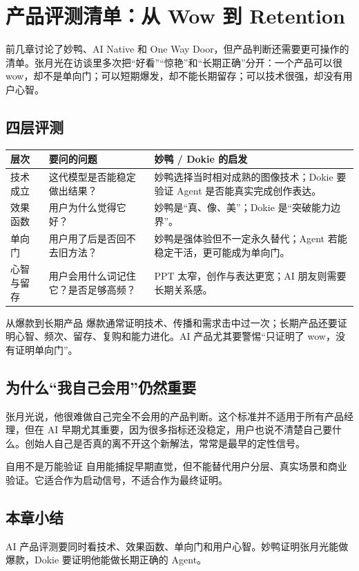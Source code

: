 \section{产品评测清单：从 Wow 到 Retention}

前几章讨论了妙鸭、AI Native 和 One Way Door，但产品判断还需要更可操作的清单。张月光在访谈里多次把“好看”“惊艳”和“长期正确”分开：一个产品可以很 wow，却不是单向门；可以短期爆发，却不能长期留存；可以技术很强，却没有用户心智。

\subsection{四层评测}

\begin{longtable}{p{}p{}p{}}
\toprule
层次 & 要问的问题 & 妙鸭 / Dokie 的启发 \\
\midrule
技术成立 & 这代模型是否能稳定做出结果？ & 妙鸭选择当时相对成熟的图像技术；Dokie 要验证 Agent 是否能真实完成创作表达。 \\
效果函数 & 用户为什么觉得它好？ & 妙鸭是“真、像、美”；Dokie 是“突破能力边界”。 \\
单向门 & 用户用了后是否回不去旧方法？ & 妙鸭是强体验但不一定永久替代；Agent 若能稳定干活，更可能成为单向门。 \\
心智与留存 & 用户会用什么词记住它？是否足够高频？ & PPT 太窄，创作与表达更宽；AI 朋友则需要长期关系感。 \\
\bottomrule
\end{longtable}

\begin{importantbox}{从爆款到长期产品}
爆款通常证明技术、传播和需求击中过一次；长期产品还要证明心智、频次、留存、复购和能力进化。AI 产品尤其要警惕“只证明了 wow，没有证明单向门”。
\end{importantbox}

\subsection{为什么“我自己会用”仍然重要}

张月光说，他很难做自己完全不会用的产品判断。这个标准并不适用于所有产品经理，但在 AI 早期尤其重要，因为很多指标还没稳定，用户也说不清楚自己要什么。创始人自己是否真的离不开这个新解法，常常是最早的定性信号。

\begin{warningbox}{自用不是万能验证}
自用能捕捉早期直觉，但不能替代用户分层、真实场景和商业验证。它适合作为启动信号，不适合作为最终证明。
\end{warningbox}

\subsection{本章小结}

AI 产品评测要同时看技术、效果函数、单向门和用户心智。妙鸭证明张月光能做爆款，Dokie 要证明他能做长期正确的 Agent。

